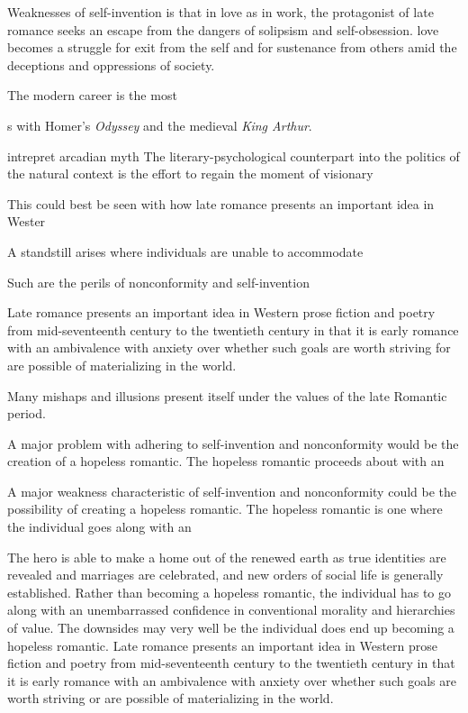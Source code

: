 \documentclass[12pt,letterpaper]{article}
\begin{document}
Weaknesses of self-invention is that in love as in work, the protagonist of late romance seeks an escape from the dangers of solipsism and self-obsession. 
love becomes a struggle for exit from the self and for sustenance from others amid the deceptions and oppressions of society.




The modern career is the most


s with Homer's \textit{Odyssey} and the medieval \textit{King Arthur}.

 intrepret arcadian myth 
 The literary-psychological counterpart into the politics of the natural 
context is the effort to regain the moment of visionary


This could best be seen with how late romance presents an important idea in Wester

 A standstill arises where individuals are unable to accommodate



Such are the perils of nonconformity and self-invention



Late romance presents an important idea in Western prose fiction and poetry from mid-seventeenth century to the twentieth century in that it is early romance with an ambivalence with anxiety over whether such goals are worth striving for are possible of materializing in the world.

Many mishaps and illusions present itself under the values of the late Romantic period.   




A major problem with adhering to self-invention and nonconformity would be the creation of a hopeless romantic.  The hopeless romantic proceeds about with an 

A major weakness characteristic of self-invention and nonconformity could be the possibility of creating a hopeless romantic.  The hopeless romantic is one where the individual goes along with an  


The hero is able to make a home out of the renewed earth as true identities are revealed and marriages are celebrated, and new orders of social life is generally established.  Rather than becoming a hopeless romantic, the individual has to go along with an unembarrassed confidence in conventional morality and hierarchies of value.  The downsides may very well be the individual does end up becoming a hopeless romantic.  Late romance presents an important idea in Western prose fiction and poetry from mid-seventeenth century to the twentieth century in that it is early romance with an ambivalence with anxiety over whether such goals are worth striving or are possible of materializing in the world.
\end{document}
